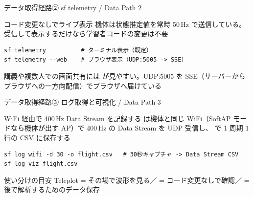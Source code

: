 \begin{frame}[fragile]{データ取得経路② sf telemetry / Data Path 2}
  \begin{block}{コード変更なしでライブ表示}
    \small 機体は状態推定値を常時 50\,Hz で送信している。受信して表示するだけなら学習者コードの変更は不要
  \end{block}

  \begin{lstlisting}[style=sfbash, numbers=none]
sf telemetry          # ターミナル表示（既定）
sf telemetry --web    # ブラウザ表示（UDP:5005 -> SSE）
  \end{lstlisting}

  \vspace{0.3em}

  {\small 講義や複数人での画面共有には  が見やすい。UDP:5005 を SSE（サーバーからブラウザへの一方向配信）でブラウザへ届けている}
\end{frame}

\begin{frame}[fragile]{データ取得経路③ ログ取得と可視化 / Data Path 3}
  \begin{block}{WiFi 経由で 400\,Hz Data Stream を記録する}
    \small {} は機体と同じ WiFi（SoftAP モードなら機体が出す AP）で 400\,Hz の Data Stream を UDP 受信し、 で 1 周期 1 行の CSV に保存する
  \end{block}

  \begin{lstlisting}[style=sfbash, numbers=none]
sf log wifi -d 30 -o flight.csv   # 30秒キャプチャ -> Data Stream CSV
sf log viz flight.csv
  \end{lstlisting}

  \vspace{0.3em}

  \begin{exampleblock}{使い分けの目安}
    \footnotesize Teleplot = その場で波形を見る／ = コード変更なしで確認／ = 後で解析するためのデータ保存
  \end{exampleblock}
\end{frame}

